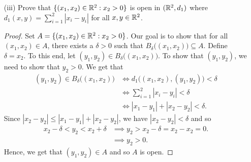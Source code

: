 \documentclass[a4paper]{article}
\begin{document}
\begin{problem}
\begin{enumerate}
\begin{proof}
        \[ {x}_{1} - \delta < {y}_{1} < {x}_{1} + \delta.  \]
        Since \( \delta < {x}_{1} \) and \( \delta < 1 - {x}_{1} \), we get that 
        \[  0 = {x}_{1} - {x}_{1} < {x}_{1} - \delta < {y}_{1} < {x}_{1} + \delta < {x}_{1} + (1- {x}_{1}) = 1. \]
        Thus, we have \( 0 < {y}_{1} < 1  \) and so \( ({y}_{1}, {y}_{2}) \in A  \). Therefore, \( {B}_{\delta}\big( ({x}_{1}, {x}_{2})  \big) \subseteq A  \) and so \( A  \) is open.
           \end{proof}
        \item[(iii)] Prove that \( \{ ({x}_{1}, {x}_{2}) \in \mathbb{R}^{2} : {x}_{2} > 0  \}   \) is open in \( (\mathbb{R}^{2}, {d}_{1}) \) where \( {d}_{1}(x,y) = \sum_{ i=1  }^{ 2 } | {x}_{i} - {y}_{i} |   \) for all \( x,y \in \mathbb{R}^{2} \).
            \begin{proof}
            Set \( A = \{  ({x}_{1}, {x}_{2}) \in \mathbb{R}^{2} : {x}_{2} > 0  \}  \). Our goal is to show that for all \( ({x}_{1}, {x}_{2}) \in A  \), there exists a \( \delta > 0  \) such that \( {B}_{\delta}\big( ({x}_{1}, {x}_{2}) \big) \subseteq  A  \). Define \( \delta = {x}_{2} \). To this end, let \( ({y}_{1}, {y}_{2}) \in {B}_{\delta}\big(({x}_{1},{x}_{2})\big) \). To show that \( ({y}_{1}, {y}_{2}) \), we need to show that \( {y}_{2} > 0  \). We get that  
            \begin{align*}
                ({y}_{1}, {y}_{2}) \in {B}_{\delta}\big(({x}_{1}, {x}_{2})\big) &\iff {d}_{1}\big(({x}_{1}, {x}_{2}), ({y}_{1}, {y}_{2})\big) < \delta \\
                                                                                &\iff \sum_{ i=1  }^{ 2 } | {x}_{i} - {y}_{i} | < \delta \\
                                                                                &\iff | {x}_{1} - {y}_{1}  |  + | {x}_{2} - {y}_{2} |  < \delta.
            \end{align*}
            Since \( | {x}_{2} - {y}_{2} |  \leq | {x}_{1} - {y}_{1} |  + | {x}_{2} - {y}_{2} |  \), we have \( | {x}_{2} - {y}_{2}  | < \delta \) and so 
            \begin{align*}
                {x}_{2} - \delta < {y}_{2} < {x}_{2} + \delta &\implies {y}_{2} > {x}_{2} - \delta = {x}_{2} - {x}_{2} = 0.   \\
                                                              &\implies {y}_{2} > 0.
        \end{align*}
        Hence, we get that \( ({y}_{1}, {y}_{2}) \in A  \) and so \( A  \) is open.
            \end{proof}
   \end{enumerate} 
\end{problem}
\end{document}

